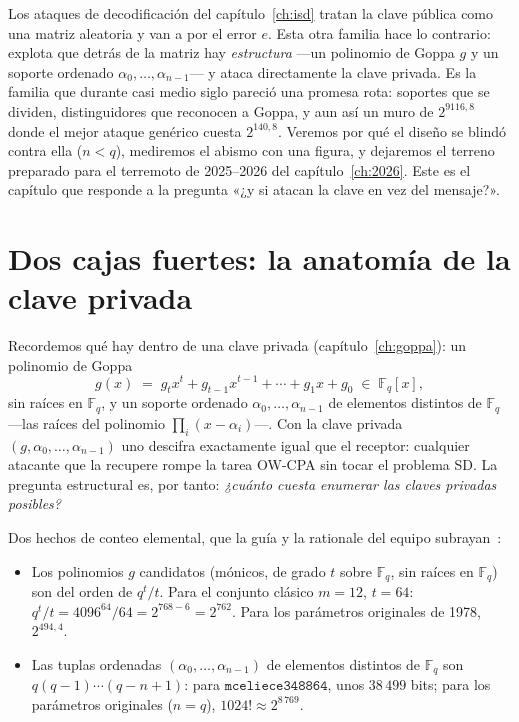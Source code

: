 \documentclass[11pt,a4paper,oneside]{report}
\newcommand{\GF}[1]{\mathbb{F}_{#1}}
\begin{document}
\begin{roadmap}
Los ataques de decodificación del capítulo~\ref{ch:isd} tratan la
clave pública como una matriz aleatoria y van a por el error $e$.
Esta otra familia hace lo contrario: explota que detrás de la matriz
hay \emph{estructura} ---un polinomio de Goppa $g$ y un soporte
ordenado $\alpha_0,\dots,\alpha_{n-1}$--- y ataca directamente la
clave privada. Es la familia que durante casi medio siglo pareció
una promesa rota: soportes que se dividen, distinguidores que
reconocen a Goppa, y aun así un muro de $2^{9116{,}8}$ donde el
mejor ataque genérico cuesta $2^{140{,}8}$. Veremos por qué el diseño
se blindó contra ella ($n<q$), mediremos el abismo con una figura, y
dejaremos el terreno preparado para el terremoto de 2025--2026 del
capítulo~\ref{ch:2026}. Este es el capítulo que responde a la
pregunta «¿y si atacan la clave en vez del mensaje?».
\end{roadmap}

\section{Dos cajas fuertes: la anatomía de la clave privada}

Recordemos qué hay dentro de una clave privada (capítulo~\ref{ch:goppa}):
un polinomio de Goppa
\[
  g(x) \;=\; g_t x^{t} + g_{t-1}x^{t-1} + \cdots + g_1 x + g_0
  \;\in\; \GF{q}[x],
\]
sin raíces en $\GF{q}$, y un soporte ordenado
$\alpha_0,\dots,\alpha_{n-1}$ de elementos distintos de $\GF{q}$
---las raíces del polinomio $\prod_i (x-\alpha_i)$---. Con la clave
privada $(g,\alpha_0,\dots,\alpha_{n-1})$ uno descifra exactamente
igual que el receptor: cualquier atacante que la recupere rompe la
tarea OW-CPA sin tocar el problema SD. La pregunta estructural es,
por tanto: \emph{¿cuánto cuesta enumerar las claves privadas
posibles?}

Dos hechos de conteo elemental, que la guía y la rationale del
equipo subrayan~\cite{cmsecurity,cmrationale}:

\begin{itemize}[leftmargin=1.5em,itemsep=3pt]
  \item Los polinomios $g$ candidatos (mónicos, de grado $t$ sobre
        $\GF{q}$, sin raíces en $\GF{q}$) son del orden de $q^{t}/t$.
        Para el conjunto clásico $m=12$, $t=64$: $q^{t}/t =
        4096^{64}/64 = 2^{768-6} = 2^{762}$. Para los parámetros
        originales de 1978, $2^{494{,}4}$.
  \item Las tuplas ordenadas $(\alpha_0,\dots,\alpha_{n-1})$ de
        elementos distintos de $\GF{q}$ son $q(q-1)\cdots(q-n+1)$:
        para $\texttt{mceliece348864}$, unos $38\,499$ bits; para los
        parámetros originales ($n=q$), $1024!\approx 2^{8\,769}$.
\end{itemize}
\end{document}

